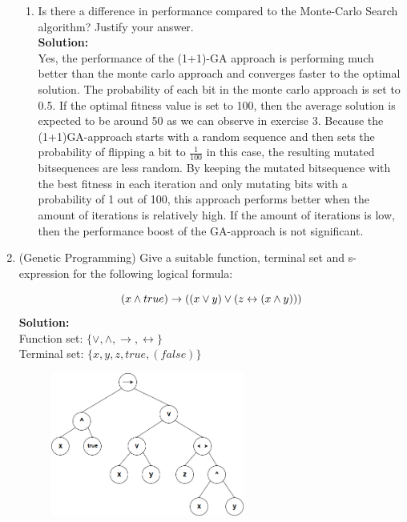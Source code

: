 \documentclass[a4paper]{article}
\begin{document}
\begin{enumerate}
\begin{enumerate}
		
		
		\item Is there a difference in performance compared to the Monte-Carlo Search algorithm? Justify your answer.\\
		\textbf{Solution:}\\

Yes, the performance of the (1+1)-GA approach is performing much better than the monte carlo approach and converges faster to the optimal solution. The probability of each bit in the monte carlo approach is set to 0.5. If the optimal fitness value is set to 100, then the average solution is expected to be around 50 as we can observe in exercise 3. Because the (1+1)GA-approach starts with a random sequence and then sets the probability of flipping a bit to $\frac{1}{100}$ in this case, the resulting mutated bitsequences are less random. By keeping the mutated bitsequence with the best fitness in each iteration and only mutating bits with a probability of 1 out of 100, this approach performs better when the amount of iterations is relatively high. If the amount of iterations is low, then the performance boost of the GA-approach is not significant.		
		
	\end{enumerate}
	
	
	\item (Genetic Programming) Give a suitable function, terminal set and s-expression for the following logical formula:
	
	\begin{equation}
		(x \wedge true) \rightarrow ((x \vee y) \vee (z \leftrightarrow (x \wedge y))) \notag
	\end{equation}
	\textbf{Solution:}\\

	Function set: $\{\vee,\wedge,\rightarrow,\leftrightarrow\}$\\
	Terminal set: $\{x,y,z,true,(false)\}$
	\begin{figure}[ht!]
	\centering
  	\includegraphics[width=0.6\textwidth]{images/s-expression.png}
	\end{figure}


\end{enumerate}
\end{document}
